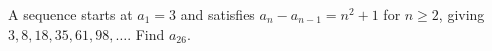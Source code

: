 A sequence starts at $a_1=3$ and satisfies $a_n-a_{n-1}=n^2+1$ for $n\ge2$, giving $3,8,18,35,61,98,\ldots$. Find $a_{26}$.
